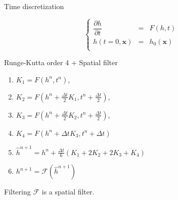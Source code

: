\documentclass[11pt]{beamer}
\begin{document}
\begin{frame}{Time discretization}

\begin{equation}
\left\lbrace
\begin{array}{rcl}
\dfrac{\partial h}{\partial t} & = & F(h,t) \\
h(t=0,\mathbf{x}) & = & h_0(\mathbf{x}) \\
\end{array}
\right.
\end{equation}

\begin{block}{Runge-Kutta order 4 + Spatial filter
}

\begin{enumerate}
\item $K_1 = F(h^n, t^n)$,
\item $K_2 = F(h^n + \frac{\Delta t}{2} K_1, t^n + \frac{\Delta t}{2})$,
\item $K_3 = F(h^n + \frac{\Delta t}{2} K_2, t^n + \frac{\Delta t}{2})$,
\item $K_4 = F(h^n + \Delta t K_3, t^n + \Delta t)$
\item $\hat{h}^{n+1} = h^n + \frac{\Delta t}{6} \left( K_1 + 2 K_2 + 2 K_3 + K_4 \right)$
\item $h^{n+1} = \mathcal{F}(\hat{h}^{n+1})$
\end{enumerate}
\end{block}


\begin{block}{Filtering}
$\mathcal{F}$ is a spatial filter.
\end{block}

\end{frame}
\end{document}
